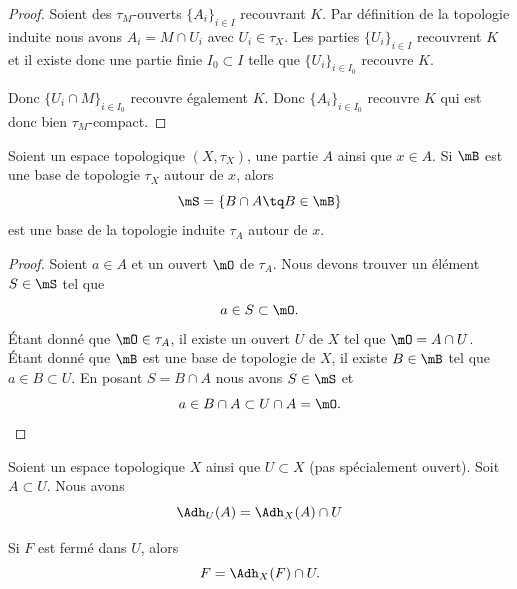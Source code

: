 \begin{proof}
	Soient des \( \tau_M\)-ouverts \( \{ A_i \}_{i\in I} \) recouvrant \( K\). Par définition de la topologie induite nous avons \( A_i=M\cap U_i\) avec \( U_i\in \tau_X\). Les parties \( \{ U_i \}_{i\in I}\) recouvrent \( K\) et il existe donc une partie finie \( I_0\subset I\) telle que \( \{ U_i \}_{i\in I_0}\) recouvre \( K\).

	Donc \( \{ U_i\cap M \}_{i\in I_0} \) recouvre également \( K\). Donc \( \{ A_i \}_{i\in I_0}\) recouvre \( K\) qui est donc bien \( \tau_M\)-compact.
\end{proof}

\begin{proposition}	\label{PROPooHQHWooFHHAXP}
	Soient un espace topologique \( (X,\tau_X)\), une partie \( A\) ainsi que \( x\in A\). Si \( \mB\) est une base de topologie \( \tau_X\) autour de \( x\), alors
	\begin{equation}
		\mS=\{ B\cap A\tq B\in\mB \}
	\end{equation}
	est une base de la topologie induite \( \tau_A\) autour de \( x\).
\end{proposition}

\begin{proof}
	Soient \( a\in A\) et un ouvert \( \mO\) de \( \tau_A\). Nous devons trouver un élément \( S\in \mS\) tel que
	\begin{equation}
		a\in S\subset\mO.
	\end{equation}
	Étant donné que \( \mO\in\tau_A\), il existe un ouvert \( U\) de \( X\) tel que \( \mO=A\cap U\). Étant donné que \( \mB\) est une base de topologie de \( X\), il existe \( B\in \mB\) tel que \(a\in B\subset U \). En posant \( S=B\cap A\) nous avons \( S\in\mS\) et
	\begin{equation}
		a\in B\cap A\subset U\cap A=\mO.
	\end{equation}
\end{proof}

\begin{lemma}	\label{LEMooCXHEooKNmLma}
	Soient un espace topologique \( X\) ainsi que \( U\subset X\) (pas spécialement ouvert). Soit \( A\subset U\). Nous avons
	\begin{equation}
		\Adh_U(A)=\Adh_X(A)\cap U
	\end{equation}

	Si \( F\) est fermé dans \( U\), alors
	\begin{equation}		\label{EQooMZOOooKHfZTk}
		F=\Adh_X(F)\cap U.
	\end{equation}
\end{lemma}

